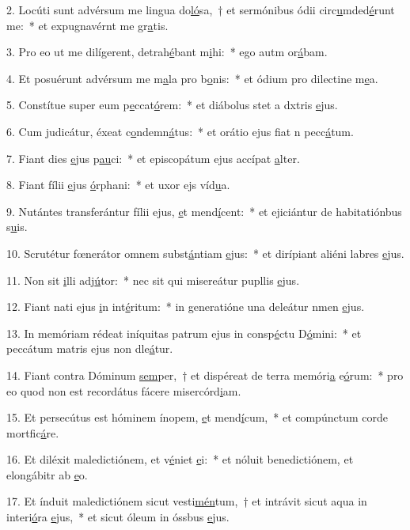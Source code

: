 2. Locúti sunt advérsum me lingua do\uline{ló}sa,~† et sermónibus ódii circ\uline{u}mded\uline{é}runt me:~* et expugnavérnt me gr\uline{a}tis.\par 
3. Pro eo ut me dilígerent, detrah\uline{é}bant m\uline{i}hi:~* ego autm or\uline{á}bam.\par 
4. Et posuérunt advérsum me m\uline{a}la pro b\uline{o}nis:~* et ódium pro dilectine m\uline{e}a.\par 
5. Constítue super eum p\uline{e}ccat\uline{ó}rem:~* et diábolus stet a dxtris \uline{e}jus.\par 
6. Cum judicátur, éxeat c\uline{o}ndemn\uline{á}tus:~* et orátio ejus fiat n pecc\uline{á}tum.\par 
7. Fiant dies \uline{e}jus p\uline{au}ci:~* et episcopátum ejus accípat \uline{a}lter.\par 
8. Fiant fílii \uline{e}jus \uline{ó}rphani:~* et uxor ejs víd\uline{u}a.\par 
9. Nutántes transferántur fílii ejus, \uline{e}t mend\uline{í}cent:~* et ejiciántur de habitatiónbus s\uline{u}is.\par 
10. Scrutétur fœnerátor omnem subst\uline{á}ntiam \uline{e}jus:~* et dirípiant aliéni labres \uline{e}jus.\par 
11. Non sit \uline{i}lli adj\uline{ú}tor:~* nec sit qui misereátur pupllis \uline{e}jus.\par 
12. Fiant nati ejus \uline{i}n int\uline{é}ritum:~* in generatióne una deleátur nmen \uline{e}jus.\par 
13. In memóriam rédeat iníquitas patrum ejus in consp\uline{é}ctu D\uline{ó}mini:~* et peccátum matris ejus non dle\uline{á}tur.\par 
14. Fiant contra Dóminum \uline{sem}per,~† et dispéreat de terra memóri\uline{a} e\uline{ó}rum:~* pro eo quod non est recordátus fácere misercórd\uline{i}am.\par 
15. Et persecútus est hóminem ínopem, \uline{e}t mend\uline{í}cum,~* et compúnctum corde mortfic\uline{á}re.\par 
16. Et diléxit maledictiónem, et v\uline{é}niet \uline{e}i:~* et nóluit benedictiónem, et elongábitr ab \uline{e}o.\par 
17. Et índuit maledictiónem sicut vesti\uline{mén}tum,~† et intrávit sicut aqua in interi\uline{ó}ra \uline{e}jus,~* et sicut óleum in óssbus \uline{e}jus.\par 
